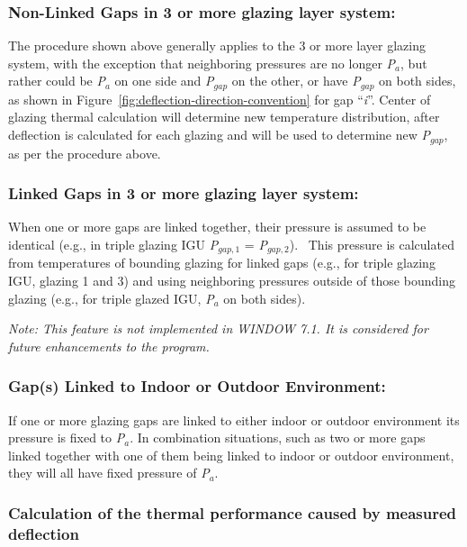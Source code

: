 \subsubsection{Non-Linked Gaps in 3 or more glazing layer system:}\label{non-linked-gaps-in-3-or-more-glazing-layer-system}

The procedure shown above generally applies to the 3 or more layer glazing system, with the exception that neighboring pressures are no longer \emph{P\(_{a}\)}, but rather could be \emph{P\(_{a}\)} on one side and \emph{P\(_{gap}\)} on the other, or have \emph{P\(_{gap}\)} on both sides, as shown in Figure~\ref{fig:deflection-direction-convention} for gap ``\emph{i}''. Center of glazing thermal calculation will determine new temperature distribution, after deflection is calculated for each glazing and will be used to determine new \emph{P\(_{gap}\)}, as per the procedure above.

\subsubsection{Linked Gaps in 3 or more glazing layer system:}\label{linked-gaps-in-3-or-more-glazing-layer-system}

When one or more gaps are linked together, their pressure is assumed to be identical (e.g., in triple glazing IGU \emph{P\(_{gap,1}\)} = \emph{P\(_{gap,2}\)}).~ This pressure is calculated from temperatures of bounding glazing for linked gaps (e.g., for triple glazing IGU, glazing 1 and 3) and using neighboring pressures outside of those bounding glazing (e.g., for triple glazed IGU, \emph{P\(_{a}\)} on both sides).

\emph{Note: This feature is not implemented in WINDOW 7.1. It is considered for future enhancements to the program.}

\subsubsection{Gap(s) Linked to Indoor or Outdoor Environment:}\label{gaps-linked-to-indoor-or-outdoor-environment}

If one or more glazing gaps are linked to either indoor or outdoor environment its pressure is fixed to \emph{P\(_{a}\)}. In combination situations, such as two or more gaps linked together with one of them being linked to indoor or outdoor environment, they will all have fixed pressure of \emph{P\(_{a}\)}.

\subsubsection{Calculation of the thermal performance caused by measured deflection}\label{calculation-of-the-thermal-performance-caused-by-measured-deflection}

